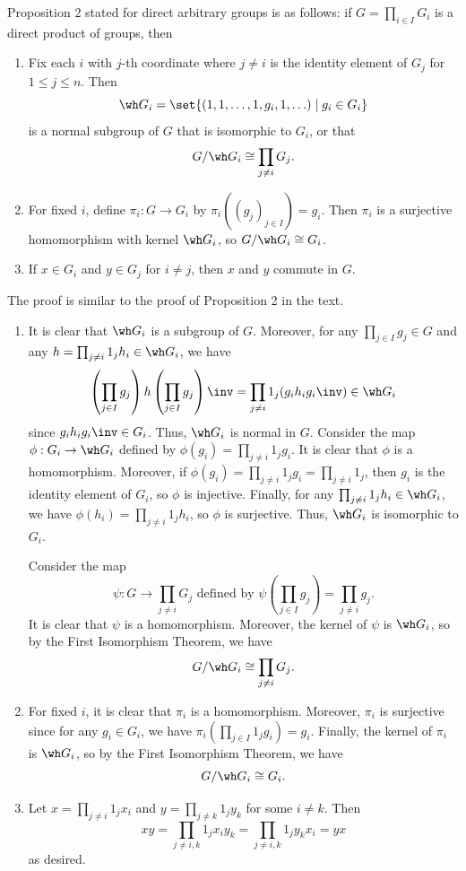 \begin{sol}
    Proposition 2 stated for direct arbitrary groups is as follows: if $G = \prod_{i \in I} G_i$ is a direct product of groups, then
    \begin{enumerate}
        \item Fix each $i$ with $j$-th coordinate where $j \neq i$ is the identity element of $G_j$ for $1 \leq j \leq n$.
	Then
        \[
        	\wh G_i = \set{(1, 1, \ldots, 1, g_i, 1, \ldots) \mid g_i \in G_i}
        \] 
        is a normal subgroup of $G$ that is isomorphic to $G_i$, or that
        \[
        	G/\wh G_i \cong \prod_{j \neq i} G_j.
        \]
        \item For fixed $i$, define $\pi_i : G \to G_i$ by $\pi_i((g_j)_{j \in I}) = g_i$.
	Then $\pi_i$ is a surjective homomorphism with kernel $\wh G_i$, so $G/\wh G_i \cong G_i$.
        \item If $x \in G_i$ and $y \in G_j$ for $i \neq j$, then $x$ and $y$ commute in $G$.
    \end{enumerate}
    The proof is similar to the proof of Proposition 2 in the text.
    \begin{enumerate}
        \item It is clear that $\wh G_i$ is a subgroup of $G$.
	Moreover, for any $\prod_{j \in I} g_j \in G$ and any $h = \prod_{j \neq i} 1_j h_i \in \wh G_i$, we have
        \[
        	\left(\prod_{j \in I} g_j\right)h\left(\prod_{j \in I} g_j\right)\inv = \prod_{j \neq i} 1_j (g_i h_i g_i\inv) \in \wh G_i
        \]
        since $g_i h_i g_i\inv \in G_i$.
	Thus, $\wh G_i$ is normal in $G$.
	Consider the map $\phi : G_i \to \wh G_i$ defined by $\phi(g_i) = \prod_{j \neq i} 1_j g_i$.
	It is clear that $\phi$ is a homomorphism.
	Moreover, if $\phi(g_i) = \prod_{j \neq i} 1_j g_i = \prod_{j \neq i} 1_j$, then $g_i$ is the identity element of $G_i$, so $\phi$ is injective.
	Finally, for any $\prod_{j \neq i} 1_j h_i \in \wh G_i$, we have $\phi(h_i) = \prod_{j \neq i} 1_j h_i$, so $\phi$ is surjective.
	Thus, $\wh G_i$ is isomorphic to $G_i$. 
        
        Consider the map
        \[
        	\psi : G \to \prod_{j \neq i} G_j \text{ defined by } \psi\left(\prod_{j \in I} g_j\right) = \prod_{j \neq i} g_j.
        \]
        It is clear that $\psi$ is a homomorphism.
	Moreover, the kernel of $\psi$ is $\wh G_i$, so by the First Isomorphism Theorem, we have
        \[
        	G/\wh G_i \cong \prod_{j \neq i} G_j.
        \]
        \item For fixed $i$, it is clear that $\pi_i$ is a homomorphism.
	Moreover, $\pi_i$ is surjective since for any $g_i \in G_i$, we have $\pi_i(\prod_{j \in I} 1_j g_i) = g_i$.
	Finally, the kernel of $\pi_i$ is $\wh G_i$, so by the First Isomorphism Theorem, we have
        \[
        	G/\wh G_i \cong G_i.
        \]
        \item Let $x = \prod_{j \neq i} 1_j x_i$ and $y = \prod_{j \neq k} 1_j y_k$ for some $i \neq k$.
	Then
        \[
        	xy = \prod_{j \neq i, k} 1_j x_i y_k = \prod_{j \neq i, k} 1_j y_k x_i = yx
        \]
        as desired.
    \end{enumerate}
\end{sol}

